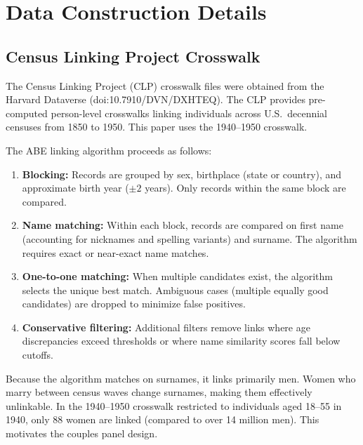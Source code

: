 \documentclass[12pt]{article}
\begin{document}
\label{apep_main_text_end}





\appendix
\renewcommand{\thesection}{A\arabic{section}}
\renewcommand{\thetable}{A\arabic{table}}
\renewcommand{\thefigure}{A\arabic{figure}}

\section{Data Construction Details}
\label{app:data}

\subsection{Census Linking Project Crosswalk}

The Census Linking Project (CLP) crosswalk files \citep{abramitzky2025clp} were obtained from the Harvard Dataverse (doi:10.7910/DVN/DXHTEQ). The CLP provides pre-computed person-level crosswalks linking individuals across U.S.\ decennial censuses from 1850 to 1950. This paper uses the 1940--1950 crosswalk.

The ABE linking algorithm proceeds as follows:

\begin{enumerate}
\item \textbf{Blocking:} Records are grouped by sex, birthplace (state or country), and approximate birth year ($\pm 2$ years). Only records within the same block are compared.
\item \textbf{Name matching:} Within each block, records are compared on first name (accounting for nicknames and spelling variants) and surname. The algorithm requires exact or near-exact name matches.
\item \textbf{One-to-one matching:} When multiple candidates exist, the algorithm selects the unique best match. Ambiguous cases (multiple equally good candidates) are dropped to minimize false positives.
\item \textbf{Conservative filtering:} Additional filters remove links where age discrepancies exceed thresholds or where name similarity scores fall below cutoffs.
\end{enumerate}

Because the algorithm matches on surnames, it links primarily men. Women who marry between census waves change surnames, making them effectively unlinkable. In the 1940--1950 crosswalk restricted to individuals aged 18--55 in 1940, only 88 women are linked (compared to over 14 million men). This motivates the couples panel design.
\end{document}
